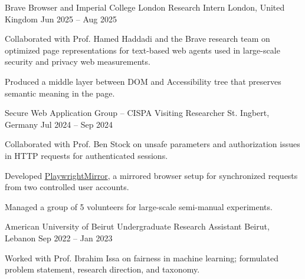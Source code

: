 \begin{cventries}
  \cventry
  {Brave Browser and Imperial College London} %
  {Research Intern} %
  {London, United Kingdom} %
  {Jun 2025 -- Aug 2025} %
  {
    \begin{cvitems} %
      \item {Collaborated with Prof. Hamed Haddadi and the Brave research team on optimized page representations for text-based web agents used in large-scale security and privacy web measurements.}
      \item {Produced a middle layer between DOM and Accessibility tree that preserves semantic meaning in the page.}
    \end{cvitems}
  }

  \cventry
  {Secure Web Application Group -- CISPA} %
  {Visiting Researcher} %
  {St. Ingbert, Germany} %
  {Jul 2024 -- Sep 2024} %
  {
    \begin{cvitems} %
      \item {Collaborated with Prof. Ben Stock on unsafe parameters and authorization issues in HTTP requests for authenticated sessions.}
      \item {Developed \href{https://github.com/Saiid2001/playwright-mirror}{PlaywrightMirror}, a mirrored browser setup for synchronized requests from two controlled user accounts.}
      \item {Managed a group of 5 volunteers for large-scale semi-manual experiments.}
    \end{cvitems}
  }

  \cventry
  {American University of Beirut} %
  {Undergraduate Research Assistant} %
  {Beirut, Lebanon} %
  {Sep 2022 -- Jan 2023} %
  {
    \begin{cvitems} %
      \item {Worked with Prof. Ibrahim Issa on fairness in machine learning; formulated problem statement, research direction, and taxonomy.}
    \end{cvitems}
  }


\end{cventries}
